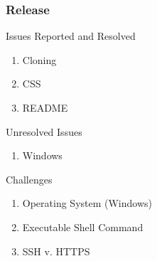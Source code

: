 \begin{frame}
	\centering
	\frametitle{Release}

	\begin{block}{Issues Reported and Resolved}
		\begin{enumerate}
			\item Cloning
			\item CSS
			\item README
		\end{enumerate}
	\end{block}

	\pause

	\begin{block}{Unresolved Issues}
		\begin{enumerate}
			\item Windows
		\end{enumerate}
	\end{block}

	\pause

	\begin{block}{Challenges}
		\begin{enumerate}
      \item Operating System (Windows)
			\item Executable Shell Command
			\item SSH v. HTTPS
		\end{enumerate}
	\end{block}

\end{frame}
